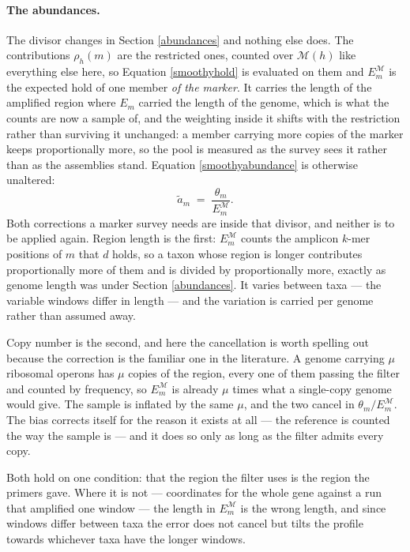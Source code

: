 \documentclass[pdflatex,sn-vancouver-num]{sn-jnl}
\begin{document}
    \paragraph{The abundances.} The divisor changes in Section \ref{abundances} and nothing else
    does. The contributions $\rho_h(m)$ are the restricted ones, counted over $\mathcal{M}(h)$ like everything
    else here, so Equation \eqref{smoothyhold} is evaluated on them and $E^{\mathcal{M}}_m$ is the expected
    hold of one member \emph{of the marker}. It carries the length of the amplified region where
    $E_m$ carried the length of the genome, which is what the counts are now a sample of, and the
    weighting inside it shifts with the restriction rather than surviving it unchanged: a member
    carrying more copies of the marker keeps proportionally more, so the pool is measured as the
    survey sees it rather than as the assemblies stand.
    Equation \eqref{smoothyabundance} is otherwise unaltered:
    \begin{equation}\label{smoothyamplicon}
        \tilde{a}_m \;=\; \frac{\theta_m}{E^{\mathcal{M}}_m} .
    \end{equation}
    Both corrections a marker survey needs are inside that divisor, and neither is to be applied
    again. Region length is the first: $E^{\mathcal{M}}_m$ counts the amplicon $k$-mer positions of $m$ that
    $d$ holds, so a taxon whose region is longer contributes proportionally more of them and is
    divided by proportionally more, exactly as genome length was under Section \ref{abundances}. It
    varies between taxa --- the variable windows differ in length --- and the variation is carried
    per genome rather than assumed away.

    Copy number is the second, and here the cancellation is worth spelling out because the
    correction is the familiar one in the literature. A genome carrying $\mu$ ribosomal operons has $\mu$
    copies of the region, every one of them passing the filter and counted by frequency, so
    $E^{\mathcal{M}}_m$ is already $\mu$ times what a single-copy genome would give. The sample is inflated by the
    same $\mu$, and the two cancel in $\theta_m / E^{\mathcal{M}}_m$. The bias corrects itself for the reason it
    exists at all --- the reference is counted the way the sample is --- and it does so only as long
    as the filter admits every copy.

    Both hold on one condition: that the region the filter uses is the region the primers gave. Where
    it is not --- coordinates for the whole gene against a run that amplified one window --- the
    length in $E^{\mathcal{M}}_m$ is the wrong length, and since windows differ between taxa the error does not
    cancel but tilts the profile towards whichever taxa have the longer windows.
\end{document}
